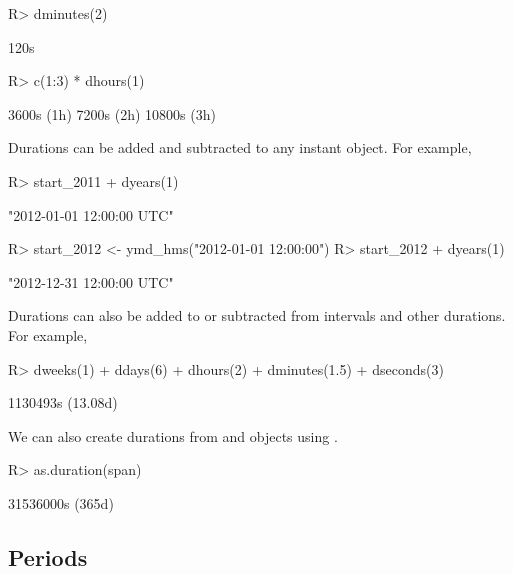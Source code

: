 \documentclass[article]{jss}
\begin{document}
\begin{CodeInput}
R> dminutes(2)
\end{CodeInput}
\begin{CodeOutput}
[1] 120s
\end{CodeOutput}

\begin{CodeInput}
R> c(1:3) * dhours(1)
\end{CodeInput}
\begin{CodeOutput}
[1]  3600s (1h)   7200s (2h)  10800s (3h)
\end{CodeOutput}

Durations can be added and subtracted to any instant object. For example,

\begin{CodeInput}
R> start_2011 + dyears(1)
\end{CodeInput}
\begin{CodeOutput}
[1] "2012-01-01 12:00:00 UTC"
\end{CodeOutput}

\begin{CodeInput}
R> start_2012 <- ymd_hms("2012-01-01 12:00:00")
R> start_2012 + dyears(1)
\end{CodeInput}
\begin{CodeOutput}
[1] "2012-12-31 12:00:00 UTC"
\end{CodeOutput}

Durations can also be added to or subtracted from intervals and other durations. For example,

\begin{CodeInput}
R> dweeks(1) + ddays(6) + dhours(2) + dminutes(1.5) + dseconds(3)
\end{CodeInput}
\begin{CodeOutput}
[1] 1130493s (13.08d)
\end{CodeOutput}

We can also create durations from  and  objects using . 

\begin{CodeInput}
R> as.duration(span)
\end{CodeInput}
\begin{CodeOutput}
[1] 31536000s (365d)
\end{CodeOutput}


\subsection{Periods}
\label{sec:periods}
\end{document}
